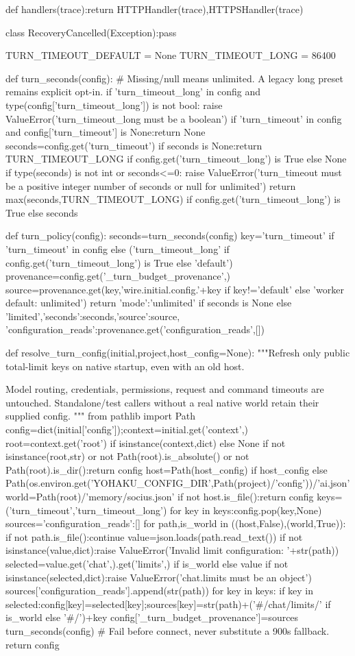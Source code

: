 def handlers(trace):return HTTPHandler(trace),HTTPSHandler(trace)


class RecoveryCancelled(Exception):pass


TURN_TIMEOUT_DEFAULT = None
TURN_TIMEOUT_LONG = 86400

def turn_seconds(config):
    # Missing/null means unlimited. A legacy long preset remains explicit opt-in.
    if 'turn_timeout_long' in config and type(config['turn_timeout_long']) is not bool:
        raise ValueError('turn_timeout_long must be a boolean')
    if 'turn_timeout' in config and config['turn_timeout'] is None:return None
    seconds=config.get('turn_timeout')
    if seconds is None:return TURN_TIMEOUT_LONG if config.get('turn_timeout_long') is True else None
    if type(seconds) is not int or seconds<=0:
        raise ValueError('turn_timeout must be a positive integer number of seconds or null for unlimited')
    return max(seconds,TURN_TIMEOUT_LONG) if config.get('turn_timeout_long') is True else seconds

def turn_policy(config):
    seconds=turn_seconds(config)
    key='turn_timeout' if 'turn_timeout' in config else ('turn_timeout_long' if config.get('turn_timeout_long') is True else 'default')
    provenance=config.get('_turn_budget_provenance',{})
    source=provenance.get(key,'wire.initial.config.'+key if key!='default' else 'worker default: unlimited')
    return {'mode':'unlimited' if seconds is None else 'limited','seconds':seconds,'source':source,
            'configuration_reads':provenance.get('configuration_reads',[])}

def resolve_turn_config(initial,project,host_config=None):
    """Refresh only public total-limit keys on native startup, even with an old host.

    Model routing, credentials, permissions, request and command timeouts are untouched.
    Standalone/test callers without a real native world retain their supplied config.
    """
    from pathlib import Path
    config=dict(initial['config']);context=initial.get('context',{})
    root=context.get('root') if isinstance(context,dict) else None
    if not isinstance(root,str) or not Path(root).is_absolute() or not Path(root).is_dir():return config
    host=Path(host_config) if host_config else Path(os.environ.get('YOHAKU_CONFIG_DIR',Path(project)/'config'))/'ai.json'
    world=Path(root)/'memory/socius.json'
    if not host.is_file():return config
    keys=('turn_timeout','turn_timeout_long')
    for key in keys:config.pop(key,None)
    sources={'configuration_reads':[]}
    for path,is_world in ((host,False),(world,True)):
        if not path.is_file():continue
        value=json.loads(path.read_text())
        if not isinstance(value,dict):raise ValueError('Invalid limit configuration: '+str(path))
        selected=value.get('chat',{}).get('limits',{}) if is_world else value
        if not isinstance(selected,dict):raise ValueError('chat.limits must be an object')
        sources['configuration_reads'].append(str(path))
        for key in keys:
            if key in selected:config[key]=selected[key];sources[key]=str(path)+('#/chat/limits/' if is_world else '#/')+key
    config['_turn_budget_provenance']=sources
    turn_seconds(config) # Fail before connect, never substitute a 900s fallback.
    return config

